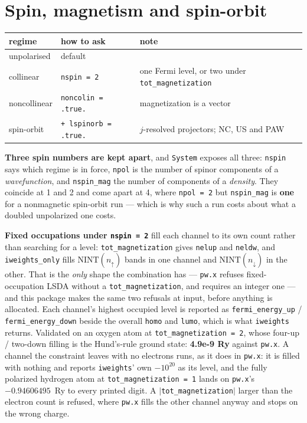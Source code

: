 \documentclass[11pt,a4paper]{article}
\newcommand{\code}[1]{\texttt{\small #1}}
\begin{document}
\section{Spin, magnetism and spin-orbit}

\begin{center}
\small
\begin{tabular}{@{}lll@{}}
\toprule
\textbf{regime} & \textbf{how to ask} & \textbf{note} \\
\midrule
unpolarised & default & \\
collinear & \code{nspin = 2} & one Fermi level, or two under \code{tot\_magnetization} \\
noncollinear & \code{noncolin = .true.} & magnetization is a vector \\
spin-orbit & \code{+ lspinorb = .true.} & $j$-resolved projectors; NC, US and PAW \\
\bottomrule
\end{tabular}
\end{center}

\textbf{Three spin numbers are kept apart}, and \code{System} exposes all three:
\code{nspin} says which regime is in force, \code{npol} is the number of spinor
components of a \emph{wavefunction}, and \code{nspin\_mag} the number of
components of a \emph{density}. They coincide at 1 and 2 and come apart at 4,
where \code{npol = 2} but \code{nspin\_mag} is \textbf{one} for a nonmagnetic
spin-orbit run --- which is why such a run costs about what a doubled
unpolarized one costs.

\textbf{Fixed occupations under \code{nspin = 2}} fill each channel to its own
count rather than searching for a level: \code{tot\_magnetization} gives
\code{nelup} and \code{neldw}, and \code{iweights\_only} fills
$\mathrm{NINT}(n_\uparrow)$ bands in one channel and $\mathrm{NINT}(n_\downarrow)$
in the other. That is the \emph{only} shape the combination has ---
\code{pw.x} refuses fixed-occupation LSDA without a \code{tot\_magnetization},
and requires an integer one --- and this package makes the same two refusals at
input, before anything is allocated. Each channel's highest occupied level is
reported as \code{fermi\_energy\_up} / \code{fermi\_energy\_down} beside the
overall \code{homo} and \code{lumo}, which is what \code{iweights} returns.
Validated on an oxygen atom at \code{tot\_magnetization = 2}, whose four-up /
two-down filling is the Hund's-rule ground state: \textbf{4.9e-9 Ry} against
\code{pw.x}. A channel the constraint leaves with no electrons runs, as it does in
\code{pw.x}: it is filled with nothing and reports \code{iweights}' own $-10^{20}$
as its level, and the fully polarized hydrogen atom at
\code{tot\_magnetization = 1} lands on \code{pw.x}'s $-0.94606495$~Ry to every
printed digit. A $|$\code{tot\_magnetization}$|$ larger than the electron count
is refused, where \code{pw.x} fills the other channel anyway and stops on the
wrong charge.
\end{document}
